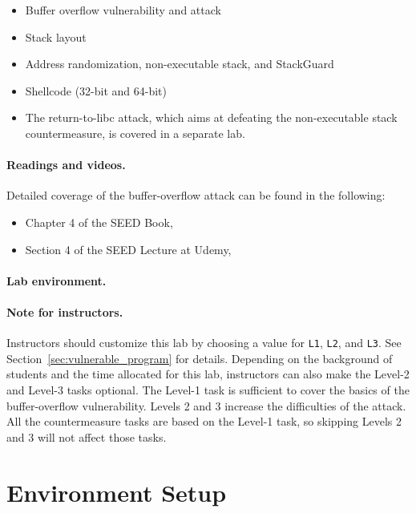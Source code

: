\begin{itemize}[noitemsep]
\item Buffer overflow vulnerability and attack
\item Stack layout 
\item Address randomization, non-executable stack, and StackGuard
\item Shellcode (32-bit and 64-bit)
\item The return-to-libc attack, which aims at 
defeating the non-executable stack countermeasure, is covered 
in a separate lab.
\end{itemize}


\paragraph{Readings and videos.}
Detailed coverage of the buffer-overflow attack can be found in the following:

\begin{itemize}
\item Chapter 4 of the SEED Book, \seedbook
\item Section 4 of the SEED Lecture at Udemy, \seedcsvideo
\end{itemize}


\paragraph{Lab environment.} 
\seedenvironmentC


\paragraph{Note for instructors.} 
Instructors should customize this lab by choosing a value
for \texttt{L1}, \texttt{L2}, and \texttt{L3}. See    
Section~\ref{sec:vulnerable_program} for details.
Depending on the background of students and the time allocated 
for this lab, instructors can also make the 
Level-2 and Level-3 tasks optional. 
The Level-1 task is sufficient to cover the basics of 
the buffer-overflow vulnerability. Levels 2 and 3
increase the difficulties of the attack. 
All the countermeasure tasks are based on the Level-1 task, 
so skipping Levels 2 and 3 will not affect those tasks. 


\section{Environment Setup}

